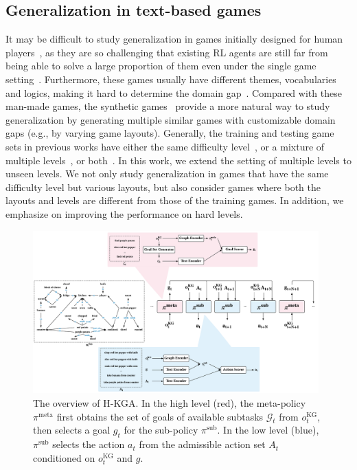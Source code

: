 \documentclass[11pt]{article}
\begin{document}
\subsection{Generalization in text-based games} 
It may be difficult to study generalization in games initially designed for human players~\cite{hausknecht2019jericho}, as they are so challenging that existing RL agents are still far from being able to solve a large proportion of them even under the single game setting~\cite{yao2020emnlp}. Furthermore, these games usually have different themes, vocabularies and logics, making it hard to determine the domain gap~\cite{ammanabrolu2019kgdqntransfer}. Compared with these man-made games, the synthetic games~\cite{cote2018textworld,urbanek2019light} provide a more natural way to study generalization by generating multiple similar games with customizable domain gaps (e.g., by varying game layouts). Generally, the training and testing game sets in previous works have either the same difficulty level~\cite{ammanabrolu2019kgdqn,murugesan2020commonsense}, or a mixture of multiple levels~\cite{adolphs2019ledeepchef,yin2020emnlpfinding}, or both~\cite{adhikari2020gatav2}. 
In this work, we extend the setting of multiple levels to unseen levels. 
We not only study generalization in games that have the same difficulty level but various layouts, but also consider games where both the layouts and levels are different from those of the training games. 
In addition, we emphasize on improving the performance on hard levels. 

\begin{figure}[t!]
\centering
\includegraphics[width=0.98\textwidth]{emnlp21_arch_final.pdf}
\caption{The overview of H-KGA. In the high level (red), the meta-policy $\pi^{\text{meta}}$ first obtains the set of goals of  available subtasks $\mathcal{G}_t$ from $o_t^{\text{KG}}$, then selects a goal $g_t$ for the sub-policy $\pi^{\text{sub}}$.
In the low level (blue), $\pi^{\text{sub}}$ selects the action $a_t$ from the admissible action set $A_t$ conditioned on $o_t^{\text{KG}}$ and $g$.}
\label{emnlp_arch}
\end{figure}
\end{document}
